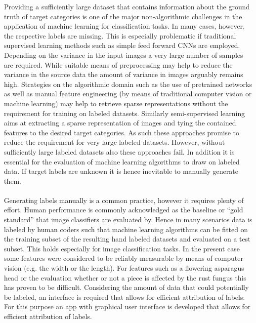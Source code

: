 Providing a sufficiently large dataset that contains information about the ground truth of target categories is one of the major non-algorithmic challenges in the application of machine learning for classification tasks. In many cases, however, the respective labels are missing. This is especially problematic if traditional supervised learning methods such as simple feed forward CNNs are employed. Depending on the variance in the input images a very large number of samples are required. While suitable means of preprocessing may help to reduce the variance in the source data the amount of variance in images arguably remains high. Strategies on the algorithmic domain such as the use of pretrained networks as well as manual feature engineering (by means of traditional computer vision or machine learning) may help to retrieve sparse representations without the requirement for training on labeled datasets. Similarly semi-supervised learning aims at extracting a sparse representation of images and tying the contained features to the desired target categories. As such these approaches promise to reduce the requirement for very large labeled datasets. However, without sufficiently large labeled datasets also these approaches fail. In addition it is essential for the evaluation of machine learning algorithms to draw on labeled data. If target labels are unknown it is hence inevitable to manually generate them. \\
\\
Generating labels manually is a common practice, however it requires plenty of effort. Human performance is commonly acknowledged as the baseline or “gold standard” that image classifiers are evaluated by. Hence in many scenarios data is labeled by human coders such that machine learning algorithms can be fitted on the training subset of the resulting hand labeled datasets and evaluated on a test subset. This holds especially for image classification tasks. In the present case some features were considered to be reliably measurable by means of computer vision (e.g. the width or the length). For features such as a flowering asparagus head or the evaluation whether or not a piece is affected by the rust fungus this has proven to be difficult. Considering the amount of data that could potentially be labeled, an interface is required that allows for efficient attribution of labels: For this purpose an app with graphical user interface is developed that allows for efficient attribution of labels. \\
\\

